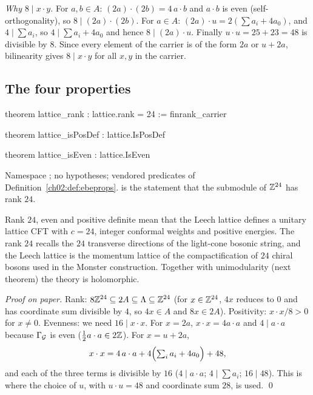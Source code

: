 \emph{Why $8\mid x\cdot y$.}  For $a,b\in A$: $(2a)\cdot(2b)=4\,a\cdot b$ and $a\cdot b$ is even
(self-orthogonality), so $8\mid(2a)\cdot(2b)$.  For $a\in A$: $(2a)\cdot u=2(\sum a_i+4a_0)$,
and $4\mid\sum a_i$, so $4\mid\sum a_i+4a_0$ and hence $8\mid(2a)\cdot u$.  Finally
$u\cdot u=25+23=48$ is divisible by $8$.  Since every element of the carrier is of the form $2a$
or $u+2a$, bilinearity gives $8\mid x\cdot y$ for all $x,y$ in the carrier.

\subsection{The four properties}

\begin{theorem}\label{ch02:thm:leechbasic}
\end{theorem}
\begin{leancode}
theorem lattice_rank : lattice.rank = 24 := finrank_carrier

theorem lattice_isPosDef : lattice.IsPosDef

theorem lattice_isEven : lattice.IsEven
\end{leancode}
\begin{dictionary}
Namespace ; no hypotheses; vendored predicates of
Definition~\ref{ch02:def:ebeprops}.   is the statement that the submodule
 of ${\mathbb{Z}}^{24}$ has rank $24$.
\end{dictionary}
\begin{physics}
Rank $24$, even and positive definite mean that the Leech lattice defines a unitary lattice CFT with $c=24$, integer conformal weights and positive energies. The rank $24$ recalls the $24$ transverse directions of the light-cone bosonic string, and the Leech lattice is the momentum lattice of the compactification of $24$ chiral bosons used in the Monster construction. Together with unimodularity (next theorem) the theory is holomorphic.
\end{physics}
\emph{Proof on paper.}  Rank: $8{\mathbb{Z}}^{24}\subseteq2A\subseteq{\Lambda}\subseteq{\mathbb{Z}}^{24}$ (for $x\in{\mathbb{Z}}^{24}$,
$4x$ reduces to $0$ and has coordinate sum divisible by $4$, so $4x\in A$ and $8x\in2A$).
Positivity: $x\cdot x/8>0$ for $x\ne0$.  Evenness: we need $16\mid x\cdot x$.  For $x=2a$,
$x\cdot x=4a\cdot a$ and $4\mid a\cdot a$ because $\Gamma_{\mathcal{G}}$ is even
($\tfrac12a\cdot a\in2{\mathbb{Z}}$).  For $x=u+2a$,
\begin{equation*}
x\cdot x=4\,a\cdot a+4\Bigl(\textstyle\sum_ia_i+4a_0\Bigr)+48,
\end{equation*}
and each of the three terms is divisible by $16$ ($4\mid a\cdot a$; $4\mid\sum a_i$; $16\mid48$).
This is where the choice of $u$, with $u\cdot u=48$ and coordinate sum $28$, is used. \qed


